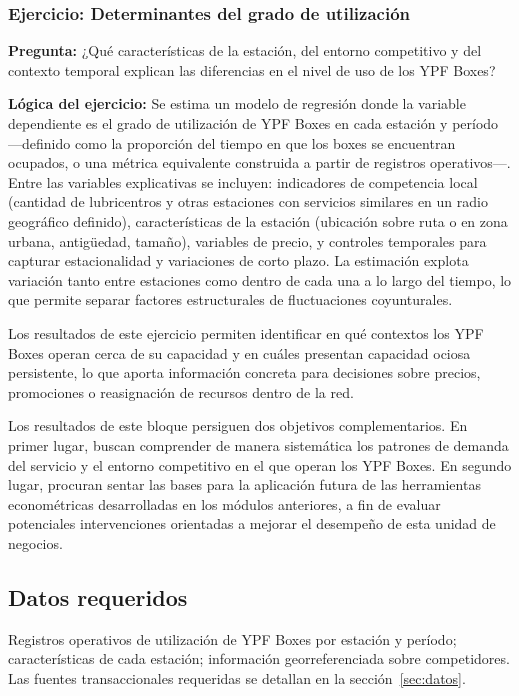 \subsubsection*{Ejercicio: Determinantes del grado de utilización}

\textbf{Pregunta:} ¿Qué características de la estación, del entorno competitivo y 
del contexto temporal explican las diferencias en el nivel de uso de los YPF Boxes?

\textbf{Lógica del ejercicio:} Se estima un modelo de regresión donde la variable 
dependiente es el grado de utilización de YPF Boxes en cada estación y período 
—definido como la proporción del tiempo en que los boxes se encuentran ocupados, 
o una métrica equivalente construida a partir de registros operativos—. Entre las 
variables explicativas se incluyen: indicadores de competencia local (cantidad de 
lubricentros y otras estaciones con servicios similares en un radio geográfico 
definido), características de la estación (ubicación sobre ruta o en zona urbana, 
antigüedad, tamaño), variables de precio, y controles temporales para capturar 
estacionalidad y variaciones de corto plazo. La estimación explota variación tanto 
entre estaciones como dentro de cada una a lo largo del tiempo, lo que permite 
separar factores estructurales de fluctuaciones coyunturales.

Los resultados de este ejercicio permiten identificar en qué contextos los YPF Boxes 
operan cerca de su capacidad y en cuáles presentan capacidad ociosa persistente, 
lo que aporta información concreta para decisiones sobre precios, promociones 
o reasignación de recursos dentro de la red.

Los resultados de este bloque persiguen dos objetivos complementarios. En primer lugar, buscan comprender de manera sistemática los patrones de demanda del servicio y el entorno competitivo en el que operan los YPF Boxes. En segundo lugar, procuran sentar las bases para la aplicación futura de las herramientas econométricas desarrolladas en los módulos anteriores, a fin de evaluar potenciales intervenciones orientadas a mejorar el desempeño de esta unidad de negocios.




\subsection{Datos requeridos}

Registros operativos de utilización de YPF Boxes por  estación y período; características de cada estación; información georreferenciada 
sobre competidores. Las fuentes transaccionales requeridas se detallan en la 
sección~\ref{sec:datos}.